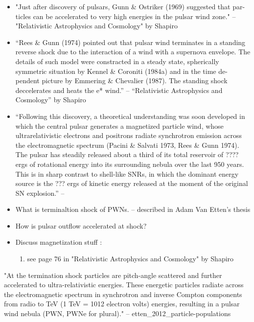 \begin{itemize}
\item
"Just after discovery of pulsars, Gunn \& Ostriker (1969) suggested
that par- ticles can be accelerated to very high energies in the pulsar
wind zone." -- "Relativistic Astrophysics and Cosmology" by Shapiro
  \item
    ``Rees \& Gunn (1974) pointed out that pulsar wind terminates in
    a standing reverse shock due to the interaction of a wind with a
    supernova envelope. The details of such model were constracted in a
    steady state, spherically symmetric situation by Kennel \& Coroniti
    (1984a) and in the time de- pendent picture by Emmering \& Chevalier
    (1987). The standing shock deccelerates and heats the e* wind.'' -- 
    ``Relativistic Astrophysics and Cosmology'' by Shapiro
  \item ``Following this discovery, a theoretical understanding was
  soon developed in which the central pulsar generates a magnetized
  particle wind, whose ultrarelativistic electrons and positrons radiate
  synchrotron emission across the electromagnetic spectrum (Pacini \&
  Salvati 1973, Rees \& Gunn 1974). The pulsar has steadily released
  about a third of its total reservoir of ???? ergs
  of rotational energy into its surrounding nebula over the last 950
  years. This is in sharp contrast to shell-like SNRs, in which the
  dominant energy source is the ??? ergs of kinetic energy
  released at the moment of the original SN explosion.''  -- \cite{gaensler_2006_evolution-structure}
  \item 
    What is terminaltion shock of \glspl{PWN}. -- described in Adam Van Etten's thesis
  \item 
    How is pulsar outflow accelerated at shock?
  \item Discuss magnetization stuff :
    \begin{enumerate}
      \item see page 76 in "Relativistic Astrophysics and Cosmology" by Shapiro
    \end{enumerate}
\end{itemize}



"At the termination shock particles are pitch-angle scattered and further
accelerated to ultra-relativistic energies. These energetic particles
radiate across the electromagnetic spectrum in synchrotron and inverse
Compton components from radio to TeV (1 TeV = 1012 electron volts)
energies, resulting in a pulsar wind nebula (PWN, PWNe for plural)." -- etten\_2012\_particle-populations

